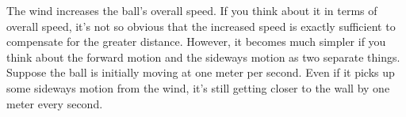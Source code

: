 The wind increases the ball's overall speed. If you think about it
 in terms of overall speed, it's not so obvious that
the increased speed is exactly sufficient to compensate for the greater distance. However, it becomes much
simpler if you think about the forward motion and the sideways motion as
 two separate things. Suppose the ball is
initially moving at one meter per second. Even if it picks
 up some sideways motion from the wind, it's still getting
closer to the wall by one meter every second.



